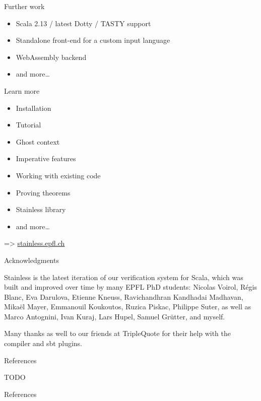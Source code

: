 \documentclass[
  ignorenonframetext,
]{beamer}
\newif\ifbibliography
\providecommand{\tightlist}{%
  \setlength{\itemsep}{0pt}\setlength{\parskip}{0pt}}
\begin{document}
\begin{frame}{Further work}
\protect\hypertarget{further-work}{}

\begin{itemize}
\tightlist
\item
  Scala 2.13 / latest Dotty / TASTY support
\item
  Standalone front-end for a custom input language
\item
  WebAssembly backend
\item
  and more\ldots{}
\end{itemize}

\end{frame}

\begin{frame}{Learn more}
\protect\hypertarget{learn-more}{}

\begin{itemize}
\tightlist
\item
  Installation
\item
  Tutorial
\item
  Ghost context
\item
  Imperative features
\item
  Working with existing code
\item
  Proving theorems
\item
  Stainless library
\item
  and more\ldots{}
\end{itemize}

=\textgreater{} \href{https://stainless.epfl.ch}{stainless.epfl.ch}

\end{frame}

\begin{frame}{Acknowledgments}
\protect\hypertarget{acknowledgments}{}

Stainless is the latest iteration of our verification system for Scala,
which was built and improved over time by many EPFL PhD students:
Nicolas Voirol, Régis Blanc, Eva Darulova, Etienne Kneuss, Ravichandhran
Kandhadai Madhavan, Mikaël Mayer, Emmanouil Koukoutos, Ruzica Piskac,
Philippe Suter, as well as Marco Antognini, Ivan Kuraj, Lars Hupel,
Samuel Grütter, and myself.

Many thanks as well to our friends at TripleQuote for their help with
the compiler and sbt plugins.

\end{frame}

\begin{frame}[allowframebreaks]{References}
\protect\hypertarget{references}{}

TODO

\end{frame}

\begin{frame}[allowframebreaks]{References}
  \bibliographytrue
  \printbibliography[heading=none]
\end{frame}
\end{document}
